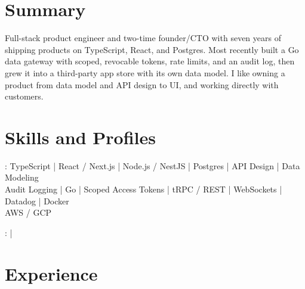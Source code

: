 \documentclass[print]{jack-resume}
\begin{document}
\pagecolor{darkmodeBackground}


\begin{minipage}[t][1cm][t]{.03\textwidth}
    \hfill
\end{minipage}

\section{Summary}
Full-stack product engineer and two-time founder/CTO with seven years of shipping products on TypeScript, React, and Postgres. Most recently built a Go data gateway with scoped, revocable tokens, rate limits, and an audit log, then grew it into a third-party app store with its own data model. I like owning a product from data model and API design to UI, and working directly with customers.
\sectionsep

\section{Skills and Profiles}
:
TypeScript \hfill | \hfill
React / Next.js \hfill | \hfill
Node.js / NestJS \hfill | \hfill
Postgres \hfill | \hfill
API Design \hfill | \hfill
Data Modeling \\
\hspace{1.0cm} Audit Logging \hfill | \hfill
Go \hfill | \hfill
Scoped Access Tokens \hfill | \hfill
tRPC / REST \hfill | \hfill
WebSockets \hfill | \hfill
Datadog \hfill | \hfill
Docker \\
\hspace{1.0cm} AWS / GCP \\

\raggedright{
    :
      \href{https://www.linkedin.com/in/jack-sturtevant/}{ \ExternalLink} |
     \href{https://github.com/jacksturt}{ \ExternalLink}}

\section{Experience}
\end{document}
